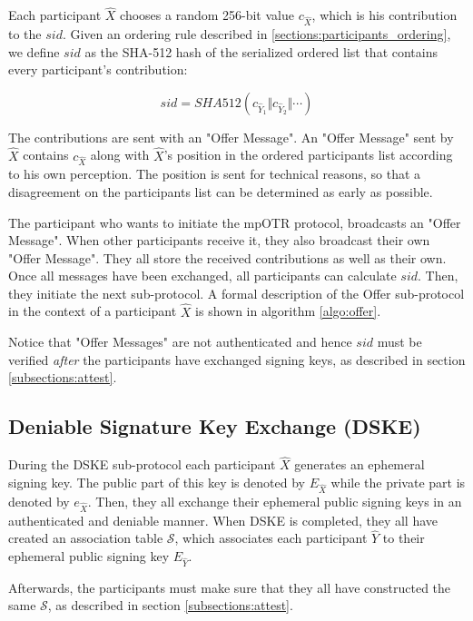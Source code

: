 Each participant $\hat{X}$ chooses a random 256-bit value $c_{\hat{X}}$, which is his contribution to the $sid$. Given an ordering rule described in \ref{sections:participants_ordering}, we define $sid$ as the SHA-512 hash of the serialized ordered list that contains every participant's contribution:

\[
  sid = SHA512(c_{\hat{Y}_1} \Vert c_{\hat{Y}_2} \Vert \cdots)
\]

The contributions are sent with an "Offer Message". An "Offer Message" sent by $\hat{X}$ contains $c_{\hat{X}}$ along with $\hat{X}$'s position in the ordered participants list according to his own perception. The position is sent for technical reasons, so that a disagreement on the participants list can be determined as early as possible.

The participant who wants to initiate the mpOTR protocol, broadcasts an "Offer Message". When other participants receive it, they also broadcast their own "Offer Message". They all store the received contributions as well as their own. Once all messages have been exchanged, all participants can calculate $sid$. Then, they initiate the next sub-protocol. A formal description of the Offer sub-protocol in the context of a participant $\hat{X}$ is shown in algorithm \ref{algo:offer}.

Notice that "Offer Messages" are not authenticated and hence $sid$ must be verified \emph{after} the participants have exchanged signing keys, as described in section \ref{subsections:attest}.

\begin{algorithm}[t]
  
\end{algorithm}


\subsection{Deniable Signature Key Exchange (DSKE)}
\label{subsections:DSKE}
During the DSKE sub-protocol each participant $\hat{X}$ generates an ephemeral signing key. The public part of this key is denoted by $E_{\hat{X}}$ while the private part is denoted by $e_{\hat{X}}$. Then, they all exchange their ephemeral public signing keys in an authenticated and deniable manner. When DSKE is completed, they all have created an association table $\mathcal{S}$, which associates each participant $\hat{Y}$ to their ephemeral public signing key $E_{\hat{Y}}$.

Afterwards, the participants must make sure that they all have constructed the same $\mathcal{S}$, as described in section \ref{subsections:attest}.

